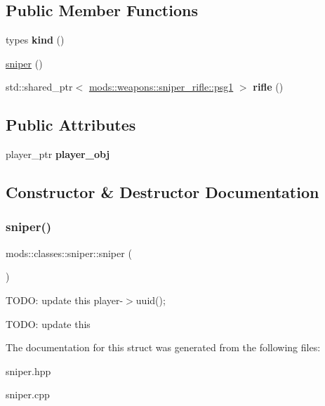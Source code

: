 \subsection*{Public Member Functions}
\begin{DoxyCompactItemize}
\item 
\mbox{\label{structmods_1_1classes_1_1sniper_a06ce4ab45fc55ddd5f2d5f59d3f8619c}} 
types {\bfseries kind} ()
\item 
\hyperlink{structmods_1_1classes_1_1sniper_a329525b9ebabd341d8fc82c87e7b4623}{sniper} ()
\item 
\mbox{\label{structmods_1_1classes_1_1sniper_ac96f1ee8063cce2584cbfc55987b6a1e}} 
std\+::shared\+\_\+ptr$<$ \hyperlink{structmods_1_1weapons_1_1sniper__rifle_1_1psg1}{mods\+::weapons\+::sniper\+\_\+rifle\+::psg1} $>$ {\bfseries rifle} ()
\end{DoxyCompactItemize}
\subsection*{Public Attributes}
\begin{DoxyCompactItemize}
\item 
\mbox{\label{structmods_1_1classes_1_1sniper_afe3f8aa90ece8bf30cddf0e225c8f4b6}} 
player\+\_\+ptr {\bfseries player\+\_\+obj}
\end{DoxyCompactItemize}


\subsection{Constructor \& Destructor Documentation}
\mbox{\label{structmods_1_1classes_1_1sniper_a329525b9ebabd341d8fc82c87e7b4623}} 
\subsubsection{\texorpdfstring{sniper()}{sniper()}}
{\footnotesize\ttfamily mods\+::classes\+::sniper\+::sniper (\begin{DoxyParamCaption}{ }\end{DoxyParamCaption})}

T\+O\+DO\+: update this player-\/$>$uuid();

T\+O\+DO\+: update this 

The documentation for this struct was generated from the following files\+:\begin{DoxyCompactItemize}
\item 
sniper.\+hpp\item 
sniper.\+cpp\end{DoxyCompactItemize}
